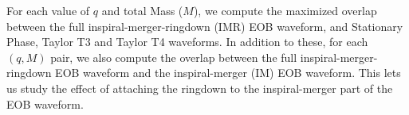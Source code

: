 \documentclass[aps,
prd,
amsmath,
amssymb,
twocolumn,
floatfix,
groupedaddress]{revtex4-1}
\begin{document}
For each value of $q$ and total Mass ($M$), we compute the maximized overlap between the full inspiral-merger-ringdown (IMR) EOB waveform, and Stationary Phase, Taylor T3 and Taylor T4 waveforms. In addition to these, for each $(q,M)$ pair, we also compute the overlap between the full inspiral-merger-ringdown EOB waveform and the inspiral-merger (IM) EOB waveform. This lets us study the effect of attaching the ringdown to the inspiral-merger part of the EOB waveform. 
\begin{figure}[htbp]
  \begin{center}
  	\mbox{
}
\end{center}
\end{figure}
\end{document}
